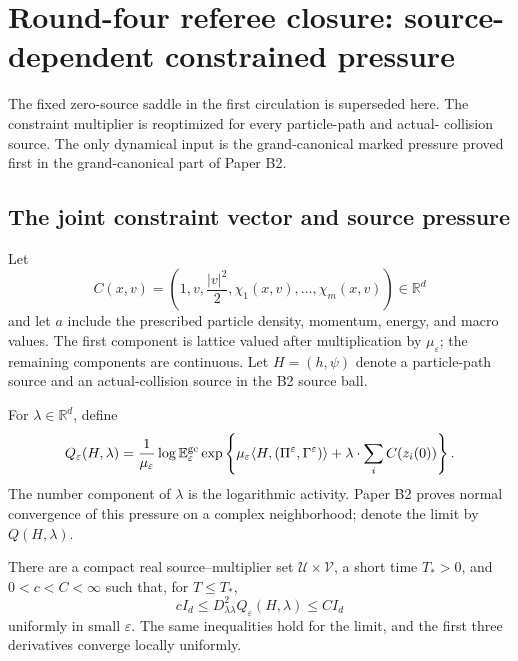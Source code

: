 \section{Round-four referee closure: source-dependent constrained pressure}
\label{sec:r3-b1}

The fixed zero-source saddle in the first circulation is superseded here.  The
constraint multiplier is reoptimized for every particle-path and actual-
collision source.  The only dynamical input is the grand-canonical marked
pressure proved first in the grand-canonical part of Paper B2.

\subsection{The joint constraint vector and source pressure}

Let
\[
 C(x,v)=\left(1,v,\frac{|v|^2}{2},\chi_1(x,v),\ldots,\chi_m(x,v)\right)
 \in\mathbb R^d
\]
and let \(a\) include the prescribed particle density, momentum, energy, and
macro values.  The first component is lattice valued after multiplication by
\(\mu_\varepsilon\); the remaining components are continuous.  Let
\(H=(h,\psi)\) denote a particle-path source and an actual-collision source in
the B2 source ball.

For \(\lambda\in\mathbb R^d\), define
\[
 Q_\varepsilon(H,\lambda)
 =\frac1{\mu_\varepsilon}
 \log\mathbb E_\varepsilon^{\rm gc}
 \exp\left\{
 \mu_\varepsilon\langle H,(\Pi^\varepsilon,\Gamma^\varepsilon)\rangle
 +\lambda\cdot\sum_iC(z_i(0))
 \right\}.
\]
The number component of \(\lambda\) is the logarithmic activity.  Paper B2
proves normal convergence of this pressure on a complex neighborhood; denote
the limit by \(Q(H,\lambda)\).

\begin{lemma}
\label{lem:r3-b1-convex}
There are a compact real source--multiplier set
\(\mathcal U\times\mathcal V\), a short time \(T_*>0\), and
\(0<c<C<\infty\) such that, for \(T\le T_*\),
\[
 cI_d\le D^2_{\lambda\lambda}Q_\varepsilon(H,\lambda)
 \le CI_d
\]
uniformly in small \(\varepsilon\).  The same inequalities hold for the
limit, and the first three derivatives converge locally uniformly.
\end{lemma}

